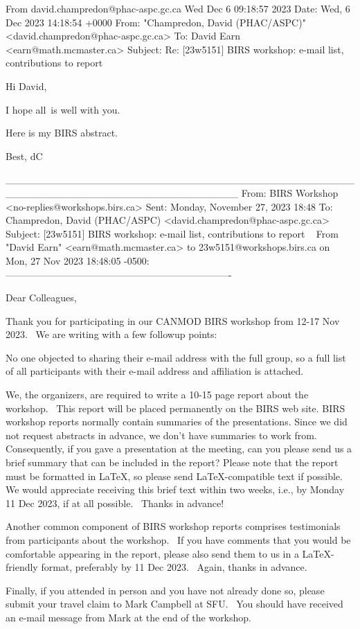 From david.champredon@phac-aspc.gc.ca Wed Dec  6 09:18:57 2023
Date: Wed, 6 Dec 2023 14:18:54 +0000
From: "Champredon, David (PHAC/ASPC)" <david.champredon@phac-aspc.gc.ca>
To: David Earn <earn@math.mcmaster.ca>
Subject: Re: [23w5151] BIRS workshop: e-mail list, contributions to report

Hi David, 

I hope all is well with you. 

Here is my BIRS abstract.

Best,
dC

________________________________________________________________________________
From: BIRS Workshop <no-replies@workshops.birs.ca>
Sent: Monday, November 27, 2023 18:48
To: Champredon, David (PHAC/ASPC) <david.champredon@phac-aspc.gc.ca>
Subject: [23w5151] BIRS workshop: e-mail list, contributions to report  
From "David Earn" <earn@math.mcmaster.ca> to 23w5151@workshops.birs.ca on Mon,
27 Nov 2023 18:48:05 -0500:
----------------------------------------------------------------------


Dear Colleagues,

Thank you for participating in our CANMOD BIRS workshop from 12-17 Nov
2023.  We are writing with a few followup points:

No one objected to sharing their e-mail address with the full group, so a
full list of all participants with their e-mail address and affiliation is
attached.

We, the organizers, are required to write a 10-15 page report about the
workshop.  This report will be placed permanently on the BIRS web site.
BIRS workshop reports normally contain summaries of the presentations.
Since we did not request abstracts in advance, we don't have summaries to
work from.  Consequently, if you gave a presentation at the meeting, can
you please send us a brief summary that can be included in the report?
Please note that the report must be formatted in LaTeX, so please send
LaTeX-compatible text if possible.  We would appreciate receiving this
brief text within two weeks, i.e., by Monday 11 Dec 2023, if at all
possible.  Thanks in advance!

Another common component of BIRS workshop reports comprises testimonials
from participants about the workshop.  If you have comments that you would
be comfortable appearing in the report, please also send them to us in a
LaTeX-friendly format, preferably by 11 Dec 2023.  Again, thanks in
advance.

Finally, if you attended in person and you have not already done so,
please submit your travel claim to Mark Campbell at SFU.  You should have
received an e-mail message from Mark at the end of the workshop.

